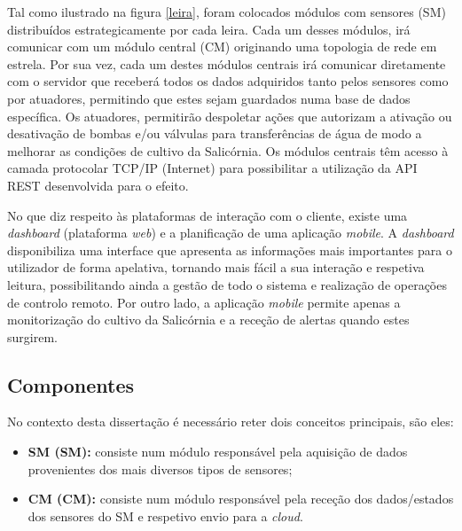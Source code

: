 Tal como ilustrado na figura \ref{leira}, foram colocados módulos com sensores (SM) distribuídos estrategicamente por cada leira. Cada um desses módulos, irá comunicar com um módulo central (CM) originando uma topologia de rede em estrela.  Por sua vez, cada um destes módulos centrais irá comunicar diretamente com o servidor que receberá todos os dados adquiridos tanto pelos sensores como por atuadores, permitindo que estes sejam guardados numa base de dados específica. Os atuadores, permitirão despoletar ações que autorizam a ativação ou desativação de bombas e/ou válvulas para transferências de água de modo a melhorar as condições de cultivo da Salicórnia. 
Os módulos centrais têm acesso à camada protocolar \ac{TCP}/\ac{IP} (Internet) para possibilitar a utilização da \acs{API} \acs{REST} desenvolvida para o efeito. 

No que diz respeito às plataformas de interação com o cliente, existe uma \textit{dashboard} (plataforma \textit{web}) e a planificação de uma aplicação \textit{mobile}. A \textit{dashboard} disponibiliza uma interface que apresenta as informações mais importantes para o utilizador de forma apelativa, tornando mais fácil a sua interação e respetiva leitura, possibilitando ainda a gestão de todo o sistema e realização de operações de controlo remoto. Por outro lado, a aplicação \textit{mobile} permite apenas a monitorização do cultivo da Salicórnia e a receção de alertas quando estes surgirem.




\subsection{Componentes}

No contexto desta dissertação é necessário reter dois conceitos principais, são eles: 

\begin{itemize}
	\item \textbf{\acl{SM} (SM):} consiste num módulo responsável pela aquisição de dados provenientes dos mais diversos tipos de sensores; 
	
	
	\item \textbf{\acl{CM} (CM):} consiste num módulo responsável pela receção dos dados/estados dos sensores do \acl{SM} e respetivo envio para a \textit{cloud}.  
	
\end{itemize}



